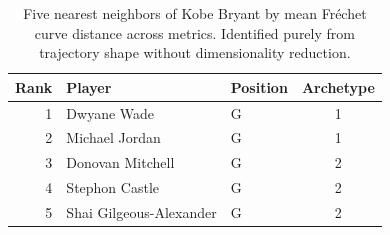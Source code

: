 \begin{table}[htbp]
  \centering\small
  \begin{tabular}{rllc}
    \toprule
    Rank & Player & Position & Archetype \\
    \midrule
    1 & Dwyane Wade & G & 1 \\
    2 & Michael Jordan & G & 1 \\
    3 & Donovan Mitchell & G & 2 \\
    4 & Stephon Castle & G & 2 \\
    5 & Shai Gilgeous-Alexander & G & 2 \\
    \bottomrule
  \end{tabular}
  \caption{Five nearest neighbors of Kobe Bryant by mean Fr\'{e}chet curve distance across metrics. Identified purely from trajectory shape without dimensionality reduction.}
  \label{tab:Kobe_Bryant_frechet_curve_neighbors}
\end{table}

